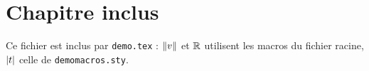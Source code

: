 \section{Chapitre inclus}

Ce fichier est inclus par \texttt{demo.tex} : $\left\lVert v \right\rVert$ et $\mathbb{R}$ utilisent les macros du fichier
racine, $\left\lvert t \right\rvert$ celle de \texttt{demomacros.sty}.
